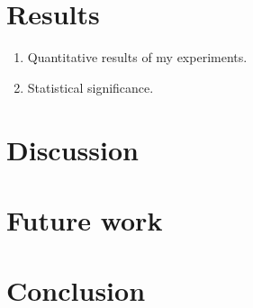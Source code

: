 \section{Results}

\begin{enumerate}
    \item Quantitative results of my experiments. 
    \item Statistical significance.
\end{enumerate}

\section{Discussion}


\section{Future work}


\section{Conclusion}
